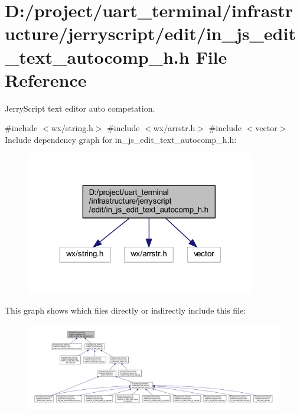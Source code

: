 \section{D\+:/project/uart\+\_\+terminal/infrastructure/jerryscript/edit/in\+\_\+js\+\_\+edit\+\_\+text\+\_\+autocomp\+\_\+h.h File Reference}
\label{in__js__edit__text__autocomp__h_8h}


Jerry\+Script text editor auto competation.  


{\ttfamily \#include $<$wx/string.\+h$>$}\newline
{\ttfamily \#include $<$wx/arrstr.\+h$>$}\newline
{\ttfamily \#include $<$vector$>$}\newline
Include dependency graph for in\+\_\+js\+\_\+edit\+\_\+text\+\_\+autocomp\+\_\+h.\+h\+:
\nopagebreak
\begin{figure}[H]
\begin{center}
\leavevmode
\includegraphics[width=284pt]{in__js__edit__text__autocomp__h_8h__incl}
\end{center}
\end{figure}
This graph shows which files directly or indirectly include this file\+:
\nopagebreak
\begin{figure}[H]
\begin{center}
\leavevmode
\includegraphics[width=350pt]{in__js__edit__text__autocomp__h_8h__dep__incl}
\end{center}
\end{figure}
